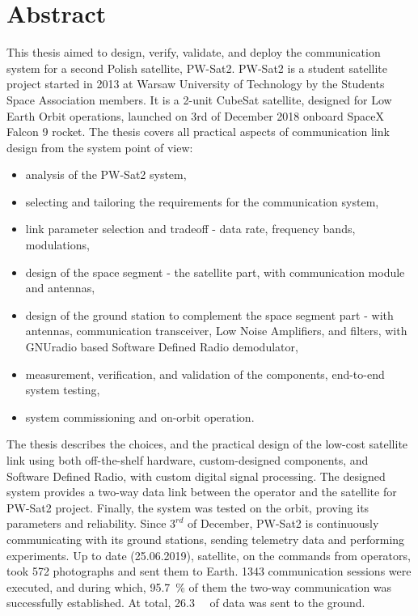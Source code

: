 \chapter{Abstract}

This thesis aimed to design, verify, validate, and deploy the communication system for a second Polish satellite, PW-Sat2. PW-Sat2 is a student satellite project started in 2013 at Warsaw University of Technology by the Students Space Association members. It is a 2-unit CubeSat satellite, designed for Low Earth Orbit operations, launched on 3rd of December 2018 onboard SpaceX Falcon 9 rocket.
The thesis covers all practical aspects of communication link design from the system point of view:
\begin{itemize}
    \setlength\itemsep{0em}
    \item analysis of the PW-Sat2 system,
    \item selecting and tailoring the requirements for the communication system,
    \item link parameter selection and tradeoff - data rate, frequency bands, modulations,
    \item design of the space segment - the satellite part, with communication module and antennas,
    \item design of the ground station to complement the space segment part - with antennas, communication transceiver, Low Noise Amplifiers, and filters, with GNUradio based Software Defined Radio demodulator,
    \item measurement, verification, and validation of the components, end-to-end system testing,
    \item system commissioning and on-orbit operation.
\end{itemize}
The thesis describes the choices, and the practical design of the low-cost satellite link using both off-the-shelf hardware, custom-designed components, and Software Defined Radio, with custom digital signal processing. The designed system provides a two-way data link between the operator and the satellite for PW-Sat2 project. Finally, the system was tested on the orbit, proving its parameters and reliability. Since $3^{rd}$ of December, PW-Sat2 is continuously communicating with its ground stations, sending telemetry data and performing experiments. Up to date (25.06.2019), satellite, on the commands from operators, took \si{572} photographs and sent them to Earth. \si{1343} communication sessions were executed, and during which, \SI{95.7}{\percent} of them the two-way communication was successfully established. At total, \SI{26.3}{\mega\byte} of data was sent to the ground.

